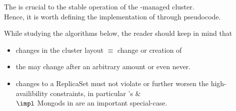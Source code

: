 The  is crucial to the stable operation of the \mamid-managed cluster.\\
Hence, it is worth defining the implementation of  through pseudocode. %

While studying the algorithms below, the reader should keep in mind that
\begin{itemize}
  \item changes in the cluster layout $\equiv$ change or creation of  
  \item the  may change after an arbitrary amount or even never.\\
  \item changes to a ReplicaSet must not violate or further worsen the high-availibility constraints,
        in particular 's  \& \\
        $\impl$ Mongods in  are an important special-case.
\end{itemize}


